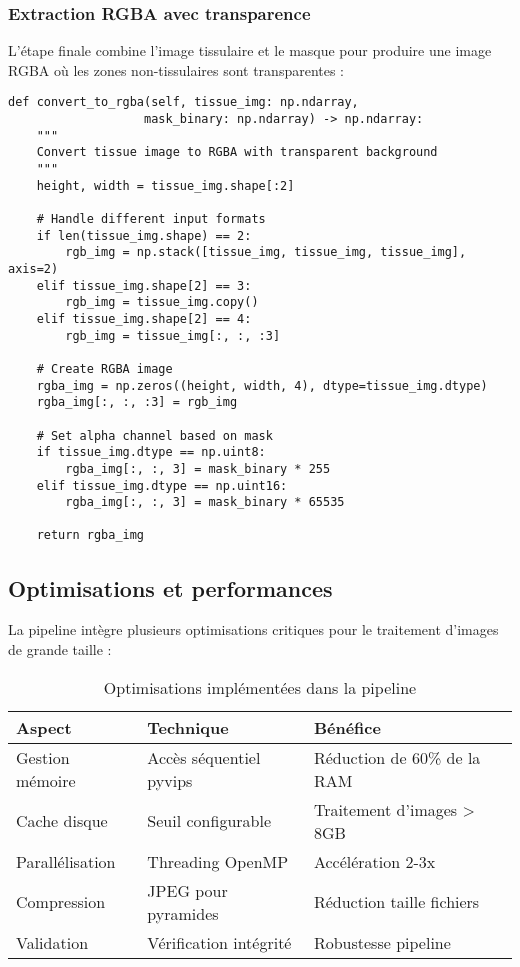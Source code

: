 \documentclass[12pt,a4paper]{report}
\begin{document}
\subsubsection{Extraction RGBA avec transparence}

L'étape finale combine l'image tissulaire et le masque pour produire une image RGBA où les zones non-tissulaires sont transparentes :

\begin{lstlisting}[caption=Conversion vers format RGBA avec transparence]
def convert_to_rgba(self, tissue_img: np.ndarray, 
                   mask_binary: np.ndarray) -> np.ndarray:
    """
    Convert tissue image to RGBA with transparent background
    """
    height, width = tissue_img.shape[:2]
    
    # Handle different input formats
    if len(tissue_img.shape) == 2:
        rgb_img = np.stack([tissue_img, tissue_img, tissue_img], axis=2)
    elif tissue_img.shape[2] == 3:
        rgb_img = tissue_img.copy()
    elif tissue_img.shape[2] == 4:
        rgb_img = tissue_img[:, :, :3]
    
    # Create RGBA image
    rgba_img = np.zeros((height, width, 4), dtype=tissue_img.dtype)
    rgba_img[:, :, :3] = rgb_img
    
    # Set alpha channel based on mask
    if tissue_img.dtype == np.uint8:
        rgba_img[:, :, 3] = mask_binary * 255
    elif tissue_img.dtype == np.uint16:
        rgba_img[:, :, 3] = mask_binary * 65535
    
    return rgba_img
\end{lstlisting}

\subsection{Optimisations et performances}

La pipeline intègre plusieurs optimisations critiques pour le traitement d'images de grande taille :

\begin{table}[H]
\centering
\caption{Optimisations implémentées dans la pipeline}
\begin{tabular}{@{}lll@{}}
\toprule
\textbf{Aspect} & \textbf{Technique} & \textbf{Bénéfice} \\
\midrule
Gestion mémoire & Accès séquentiel pyvips & Réduction de 60\% de la RAM \\
Cache disque & Seuil configurable & Traitement d'images > 8GB \\
Parallélisation & Threading OpenMP & Accélération 2-3x \\
Compression & JPEG pour pyramides & Réduction taille fichiers \\
Validation & Vérification intégrité & Robustesse pipeline \\
\bottomrule
\end{tabular}
\label{tab:optimisations-pipeline}
\end{table}
\end{document}
